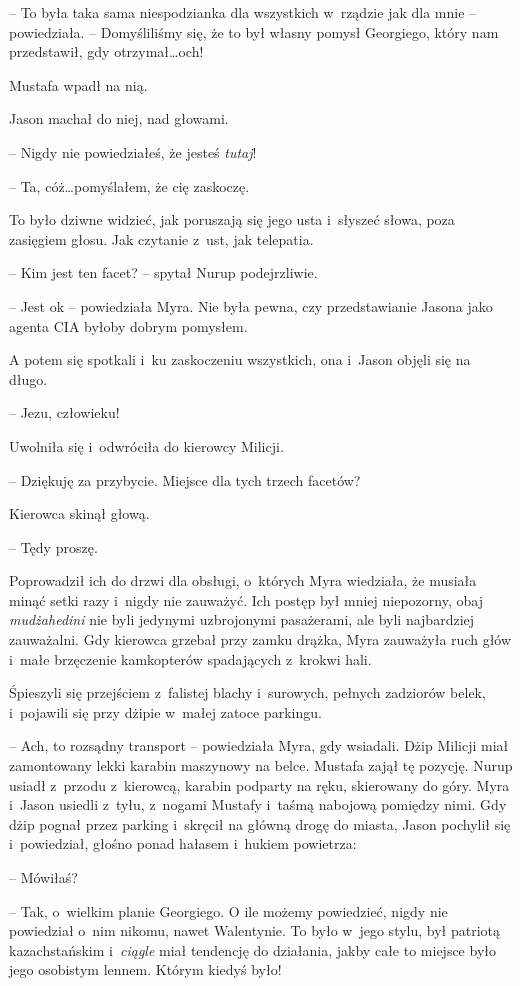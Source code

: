 \documentclass[oneside,polish,11pt,sfheadings]{mwbk}
\begin{document}
-- To była taka sama niespodzianka dla wszystkich w~rządzie jak dla mnie
-- powiedziała. -- Domyśliliśmy się, że to był własny pomysł Georgiego,
który nam przedstawił, gdy otrzymał\ldots och!

Mustafa wpadł na nią.

Jason machał do niej, nad głowami.

-- Nigdy nie powiedziałeś, że jesteś \textit{tutaj}!

-- Ta, cóż\ldots pomyślałem, że cię zaskoczę.

To było dziwne widzieć, jak poruszają się jego usta i~słyszeć słowa,
poza zasięgiem głosu. Jak czytanie z~ust, jak telepatia.

-- Kim jest ten facet? -- spytał Nurup podejrzliwie.

-- Jest ok -- powiedziała Myra. Nie była pewna, czy przedstawianie Jasona
jako agenta CIA byłoby dobrym pomysłem.

A potem się spotkali i~ku zaskoczeniu wszystkich, ona i~Jason objęli się
na długo.

-- Jezu, człowieku!

Uwolniła się i~odwróciła do kierowcy Milicji.

-- Dziękuję za przybycie. Miejsce dla tych trzech facetów?

Kierowca skinął głową. 

-- Tędy proszę.

Poprowadził ich do drzwi dla obsługi, o~których Myra wiedziała, że
musiała minąć setki razy i~nigdy nie zauważyć. Ich postęp był mniej
niepozorny, obaj \textit{mudżahedini} nie byli jedynymi uzbrojonymi
pasażerami, ale byli najbardziej zauważalni. Gdy kierowca grzebał przy
zamku drążka, Myra zauważyła ruch głów i~małe brzęczenie kamkopterów
spadających z~krokwi hali.

Śpieszyli się przejściem z~falistej blachy i~surowych, pełnych zadziorów
belek, i~pojawili się przy dżipie w~małej zatoce parkingu.

-- Ach, to rozsądny transport -- powiedziała Myra, gdy wsiadali. Dżip
Milicji miał zamontowany lekki karabin maszynowy na belce. Mustafa zajął
tę pozycję. Nurup usiadł z~przodu z~kierowcą, karabin podparty na ręku,
skierowany do góry. Myra i~Jason usiedli z~tyłu, z~nogami Mustafy i~taśmą nabojową pomiędzy nimi. Gdy dżip pognał przez parking i~skręcił na
główną drogę do miasta, Jason pochylił się i~powiedział, głośno ponad
hałasem i~hukiem powietrza: 

-- Mówiłaś?

-- Tak, o~wielkim planie Georgiego. O ile możemy powiedzieć, nigdy nie
powiedział o~nim nikomu, nawet Walentynie. To było w~jego stylu, był
patriotą kazachstańskim i~\textit{ciągle} miał tendencję do działania,
jakby całe to miejsce było jego osobistym lennem. Którym kiedyś było!
\end{document}
